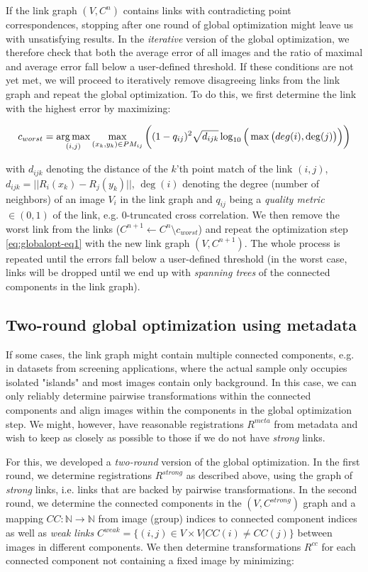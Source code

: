 If the link graph $(V,C^n)$ contains links with contradicting point correspondences, stopping after one round of global optimization might leave us with unsatisfying results. In the \emph{iterative} version of the global optimization, we therefore check that both the average error of all images and the ratio of maximal and average error fall below a user-defined threshold. If these conditions are not yet met, we will proceed to iteratively remove disagreeing links from the link graph and repeat the global optimization. To do this, we first determine the link with the highest error by maximizing:

\begin{equation}
\label{eq:globalopt-eq3}
c_{worst} = \operatorname*{arg\,max}_{(i,j)} \max_{(x_k, y_k) \in PM_{ij}}\bigg( (1-q_{ij})^2 \sqrt{d_{ijk}} \log_{10}\Big(\max\big(deg(i), \deg(j)\big)\Big)\bigg) 
\end{equation}

with $d_{ijk}$ denoting the distance of the $k$'th point match of the link $(i,j)$, $d_{ijk} = || R_{i}(x_k) - R_{j}(y_k) ||$, $\deg(i)$ denoting the degree (number of neighbors) of an image $V_i$ in the link graph and $q_{ij}$ being a \emph{quality metric} $\in (0,1)$ of the link, e.g. 0-truncated cross correlation. We then remove the worst link from the links ($C^{n+1} \leftarrow C^{n} \setminus c_{worst}$) and repeat the optimization step \ref{eq:globalopt-eq1} with the new link graph $(V, C^{n+1})$. The whole process is repeated until the errors fall below a user-defined threshold (in the worst case, links will be dropped until we end up with \emph{spanning trees} of the connected components in the link graph). 

\subsection*{Two-round global optimization using metadata}

If some cases, the link graph might contain multiple connected components, e.g. in datasets from screening applications, where the actual sample only occupies isolated "islands" and most images contain only background. In this case, we can only reliably determine pairwise transformations within the connected components and align images within the components in the global optimization step. We might, however, have reasonable registrations $R^{meta}$ from metadata and wish to keep as closely as possible to those if we do not have \emph{strong} links.

For this, we developed a \emph{two-round} version of the global optimization. In the first round, we determine registrations $R^{strong}$ as described above, using the graph of \emph{strong} links, i.e. links that are backed by pairwise transformations. In the second round, we determine the connected components in the $(V, C^{strong} )$ graph and a mapping $CC: \mathbb{N} \to \mathbb{N}$ from image (group) indices to  connected component indices as well as \emph{weak links} $C^{weak} = \{(i,j) \in V \times V | CC(i) \neq CC(j) \}$ between images in different components. We then determine transformations $R^{cc}$ for each connected component not containing a fixed image by minimizing:

